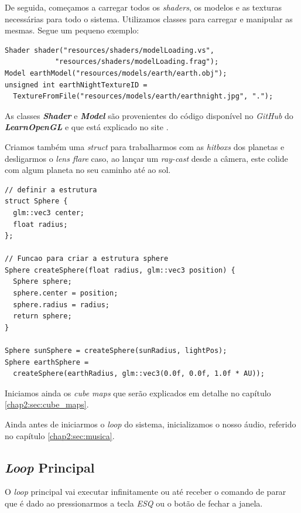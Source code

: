 \noindent
De seguida, começamos a carregar todos os \textit{shaders}, os modelos e as texturas necessárias para todo o sistema. Utilizamos classes para carregar e manipular as mesmas.
Segue um pequeno exemplo:

\newpage

\begin{lstlisting}[style=Cpp, caption=Carregamento das \textit{shaders}{,} modelos e texturas]
Shader shader("resources/shaders/modelLoading.vs",
            "resources/shaders/modelLoading.frag");
Model earthModel("resources/models/earth/earth.obj");
unsigned int earthNightTextureID =
  TextureFromFile("resources/models/earth/earthnight.jpg", ".");
\end{lstlisting}

\noindent
As classes \textbf{\textit{Shader}} e \textbf{ \textit{Model}} são provenientes do código disponível no \textit{GitHub} do \textbf{\textit{LearnOpenGL}} \cite{lopglgithub} e que está explicado no site \cite{lopgl}.

\noindent
Criamos também uma \textit{struct} para trabalharmos com as \textit{hitboxs} dos planetas e desligarmos o \textit{lens flare} caso, ao lançar um \textit{ray-cast} desde a câmera, este colide com algum planeta no seu caminho até ao sol.

\begin{lstlisting}[style=Cpp, caption=Colisões parte 1]
// definir a estrutura
struct Sphere {
  glm::vec3 center;
  float radius;
};

// Funcao para criar a estrutura sphere
Sphere createSphere(float radius, glm::vec3 position) {
  Sphere sphere;
  sphere.center = position;
  sphere.radius = radius;
  return sphere;
}

Sphere sunSphere = createSphere(sunRadius, lightPos);
Sphere earthSphere =
  createSphere(earthRadius, glm::vec3(0.0f, 0.0f, 1.0f * AU));
\end{lstlisting}

\noindent
Iniciamos ainda os \textit{cube maps} que serão explicados em detalhe no capítulo \ref{chap2:sec:cube_maps}.

\noindent
Ainda antes de iniciarmos o \textit{loop} do sistema, inicializamos o nosso áudio, referido no capítulo \ref{chap2:sec:musica}.

\subsection{\textit{Loop} Principal}

\noindent
O \textit{loop} principal vai executar infinitamente ou até receber o comando de parar que é dado ao pressionarmos a tecla \textit{ESQ} ou o botão de fechar a janela.

